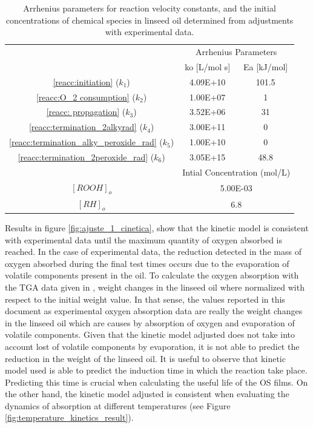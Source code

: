 \begin{refsection}
\begin{table}[H]
\centering
\caption{Arrhenius parameters for reaction velocity constants, and the initial concentrations of chemical species in linseed oil determined from adjustments with experimental data. }
\label{tab:kinetic parameters}

\begin{tabular}{ccc}
\hline
\multirow{2}{*}{} & \multicolumn{2}{c}{Arrhenius   Parameters}  \\
                  & ko {[}L/mol s{]}         & Ea {[}kJ/mol{]}   \\ \hline
\ref{reacc:initiation} ($k_1$)  & 4.09E+10   & 101.5             \\ 
\ref{reacc:O_2 consumption} ($k_2$) & 1.00E+07 & 1               \\ 
\ref{reacc: propagation} ($k_3$) & 3.52E+06  & 31                 \\ 
\ref{reacc:termination_2alkyrad} ($k_4$)  & 3.00E+11 & 0          \\ 
\ref{reacc:termination_alky_peroxide_rad} ($k_5$) & 1.00E+10 & 0   \\
\ref{reacc:termination_2peroxide_rad} ($k_6$)  & 3.05E+15 & 48.8    \\ \hline
                  & \multicolumn{2}{c}{Intial   Concentration (mol/L)} \\
$[ROOH]_o$        & \multicolumn{2}{c}{5.00E-03}                       \\
$[RH]_o$          & \multicolumn{2}{c}{6.8} \\ \hline           
\end{tabular}%
\end{table}

Results in figure \ref{fig:ajuste_1_cinetica}, show that the kinetic model is consistent with experimental data until the maximum  quantity of oxygen absorbed is reached. In the case of experimental data, the reduction detected in the mass of oxygen absorbed during the final test times occurs due to the evaporation of volatile components present in the oil. To calculate the oxygen absorption with the TGA data given in \cite{lazzari1999drying}, weight changes in the linseed oil where normalized with respect to the initial weight value. In that sense, the values reported in this document as experimental oxygen absorption data  are really the weight changes in the linseed oil which are causes by absorption of oxygen and evaporation of volatile components. Given that the kinetic model adjusted does not take into account lost of volatile components by evaporation, it is not able to predict the reduction in the weight of the linseed oil.  It is useful to observe that kinetic model used  is able to predict the induction time in which the reaction take place. Predicting this time is crucial when calculating the useful life of the OS films. On the other hand, the kinetic model adjusted is consistent when evaluating the dynamics of absorption at different temperatures (see Figure \ref{fig:temperature_kinetics_result}).


\end{refsection}
